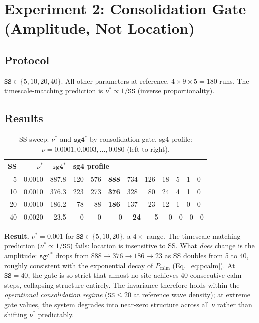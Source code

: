 \documentclass[11pt]{article}
\theoremstyle{remark}
\begin{document}
\section{Experiment 2: Consolidation Gate (Amplitude, Not Location)}

\subsection{Protocol}

$\mathtt{SS} \in \{5, 10, 20, 40\}$. All other parameters at reference.
$4 \times 9 \times 5 = 180$ runs. The timescale-matching prediction is
$\nu^* \propto 1/\mathtt{SS}$ (inverse proportionality).

\subsection{Results}

\begin{table}[h]
\centering
\caption{SS sweep: $\nu^*$ and $\mathtt{sg4}^*$ by consolidation gate. sg4
profile: $\nu = 0.0001, 0.0003, \ldots, 0.080$ (left to right).}
\label{tab:exp2}
\begin{tabular}{r r r l}
\toprule
SS & $\nu^*$ & $\mathtt{sg4}^*$ & sg4 profile \\
\midrule
 5 & 0.0010 & 887.8 & 120\ \ 576\ \ \textbf{888}\ \ 734\ \ 126\ \ 18\ \ 5\ \ 1\ \ 0 \\
10 & 0.0010 & 376.3 & 223\ \ 273\ \ \textbf{376}\ \ 328\ \ \ 80\ \ 24\ \ 4\ \ 1\ \ 0 \\
20 & 0.0010 & 186.2 & \ 78\ \ \ 88\ \ \textbf{186}\ \ 137\ \ \ 23\ \ 12\ \ 1\ \ 0\ \ 0 \\
40 & 0.0020 & \ 23.5 & \ \ 0\ \ \ \ 0\ \ \ \ \ 0\ \ \ \textbf{24}\ \ \ \ 5\ \ \ 0\ \ 0\ \ 0\ \ 0 \\
\bottomrule
\end{tabular}
\end{table}

\textbf{Result.} $\nu^* = 0.001$ for $\mathtt{SS} \in \{5, 10, 20\}$, a
$4\times$ range. The timescale-matching prediction ($\nu^* \propto
1/\mathtt{SS}$) fails: location is insensitive to SS. What \emph{does} change
is the amplitude: $\mathtt{sg4}^*$ drops from $888 \to 376 \to 186 \to 23$
as SS doubles from 5 to 40, roughly consistent with the exponential decay
of $P_{\text{calm}}$ (Eq.~\eqref{eq:pcalm}). At $\mathtt{SS} = 40$, the
gate is so strict that almost no site achieves 40 consecutive calm steps,
collapsing structure entirely. The invariance therefore holds within the
\emph{operational consolidation regime} ($\mathtt{SS} \leq 20$ at reference
wave density); at extreme gate values, the system degrades into near-zero
structure across all $\nu$ rather than shifting $\nu^*$ predictably.
\end{document}
